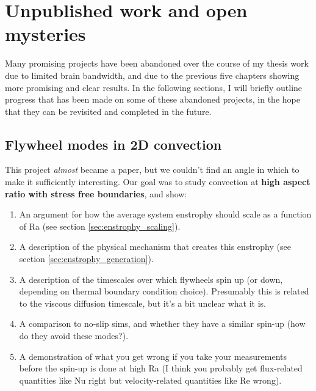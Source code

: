 \chapter{Unpublished work and open mysteries}
\label{ch:unpublished}

Many promising projects have been abandoned over the course of my thesis work due to limited brain bandwidth, and due to the previous five chapters showing more promising and clear results.
In the following sections, I will briefly outline progress that has been made on some of these abandoned projects, in the hope that they can be revisited and completed in the future.

\section{Flywheel modes in 2D convection}
\label{sec:flywheels}
This project \emph{almost} became a paper, but we couldn't find an angle in which to make it sufficiently interesting.
Our goal was to study \RB convection at \textbf{high aspect ratio with stress free boundaries}, and show:
\begin{enumerate}
\item An argument for how the average system enstrophy should scale as a function of Ra (see section \ref{sec:enstrophy_scaling}).
\item A description of the physical mechanism that creates this enstrophy (see section \ref{sec:enstrophy_generation}).
\item A description of the timescales over which flywheels spin up (or down, depending on thermal boundary condition choice).
Presumably this is related to the viscous diffusion timescale, but it's a bit unclear what it is.
\item A comparison to no-slip sims, and whether they have a similar spin-up (how do they avoid these modes?).
\item A demonstration of what you get wrong if you take your measurements before the spin-up is done at high Ra (I think you probably get flux-related quantities like Nu right but velocity-related quantities like Re wrong).
\end{enumerate}

